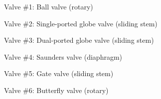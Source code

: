 





Valve \#1: Ball valve (rotary)

\vskip 10pt

Valve \#2: Single-ported globe valve (sliding stem)

\vskip 10pt

Valve \#3: Dual-ported globe valve (sliding stem)

\vskip 10pt

Valve \#4: Saunders valve (diaphragm)

\vskip 10pt

Valve \#5: Gate valve (sliding stem)

\vskip 10pt

Valve \#6: Butterfly valve (rotary)










